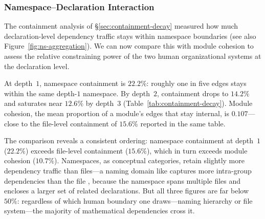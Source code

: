 \subsubsection{Namespace--Declaration Interaction}
\label{sec:ns-decl-interaction}

The containment analysis of \S\ref{sec:containment-decay} measured how much declaration-level dependency traffic stays within namespace boundaries (see also Figure~\ref{fig:ns-aggregation}). We can now compare this with module cohesion to assess the relative constraining power of the two human organizational systems at the declaration level.

At depth~$1$, namespace containment is $22.2\%$: roughly one in five edges stays within the same depth-$1$ namespace. By depth~$2$, containment drops to $14.2\%$ and saturates near $12.6\%$ by depth~$3$ (Table~\ref{tab:containment-decay}). Module cohesion, the mean proportion of a module's edges that stay internal, is $0.107$---close to the file-level containment of $15.6\%$ reported in the same table.

The comparison reveals a consistent ordering: namespace containment at depth~$1$ ($22.2\%$) exceeds file-level containment ($15.6\%$), which in turn exceeds module cohesion ($10.7\%$). Namespaces, as conceptual categories, retain slightly more dependency traffic than files---a naming domain like  captures more intra-group dependencies than the file , because the namespace spans multiple files and encloses a larger set of related declarations. But all three figures are far below~$50\%$: regardless of which human boundary one draws---naming hierarchy or file system---the majority of mathematical dependencies cross it.

